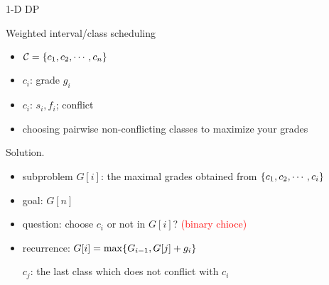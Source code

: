 \begin{frame}{1-D DP}
  \begin{exampleblock}{Weighted interval/class scheduling }
    \begin{itemize}
      \item $\mathcal{C} = \{c_{1}, c_{2}, \cdots, c_{n}\}$
      \item $c_{i}$: grade $g_{i}$
      \item $c_{i}$: $s_{i}, f_{i}$; conflict
      \item choosing pairwise non-conflicting classes to maximize your grades
    \end{itemize}
  \end{exampleblock}

  \begin{block}{Solution.}
    \begin{itemize}
      \item subproblem $G[i]$: the maximal grades obtained from $\{c_{1}, c_{2}, \cdots, c_{i}\}$
      \item goal: $G[n]$
      \item question: choose $c_{i}$ or not in $G[i]$? {\footnotesize \textcolor{red}{(binary chioce)}}
      \item recurrence: $G[i] = \max \{G_{i-1}, G[j] + g_{i}\}$ 
	
	$c_{j}$: the last class which does not conflict with $c_{i}$
    \end{itemize}
  \end{block}
\end{frame}
